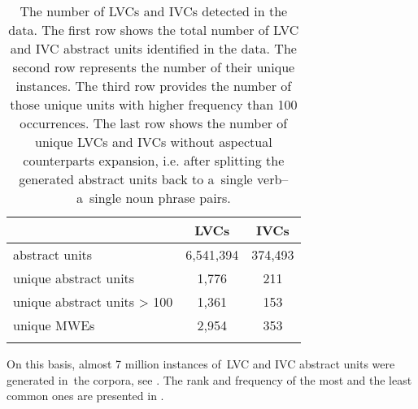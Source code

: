 \documentclass[output=paper
,modfonts
,nonflat]{langsci/langscibook}
\begin{document}
\begin{table}[tb]
\centering
\caption{The number of LVCs and IVCs detected in the data. The first row shows 
the total number of LVC and IVC abstract units identified in the data. The second 
row represents the number of their unique instances. The third row provides the 
number of those unique units with higher frequency than 100 occurrences. The 
last row shows the number of unique LVCs and IVCs without aspectual 
counterparts expansion, i.e. after splitting the generated abstract units back 
to a~single verb--a~single noun phrase pairs.}

\label{data_preprocessing}
\begin{tabular}{lcc}
\lsptoprule        & LVCs        & IVCs \\ \midrule
abstract units     & 6,541,394   & 374,493    \\ \hline
unique abstract units       & 1,776       &  211    \\ \hline
unique abstract units > 100 & 1,361       &  153    \\ \hline
unique MWEs        & 2,954       & 353    \\ \lspbottomrule
\end{tabular}
\end{table}


On this basis, almost 7 million instances of~LVC and IVC abstract units were 
generated in~the corpora, see . The rank and 
frequency of the most and the least common ones are presented in 
.
\end{document}
